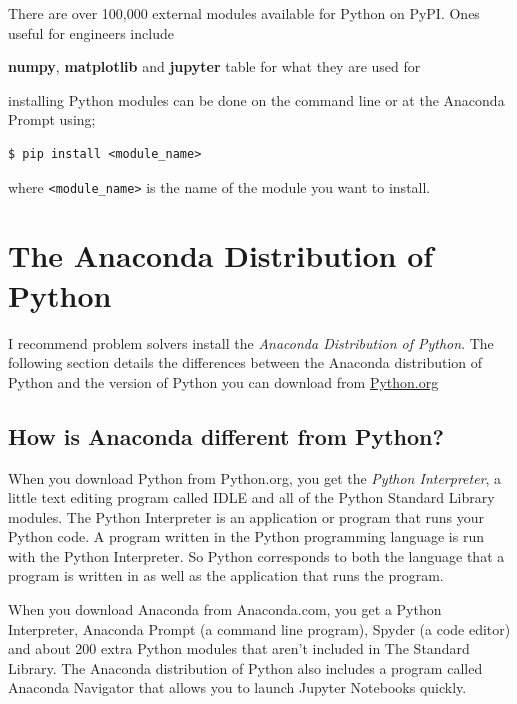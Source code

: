 \documentclass{book}
\begin{document}
There are over 100,000 external modules available for Python on PyPI.
Ones useful for engineers include

\textbf{numpy}, \textbf{matplotlib} and \textbf{jupyter} table for what
they are used for

installing Python modules can be done on the command line or at the
Anaconda Prompt using;

\begin{lstlisting}
$ pip install <module_name>
\end{lstlisting}

where \lstinline!<module_name>! is the name of the module you want to
install.
    




    
        \section{The Anaconda Distribution of
Python}\label{the-anaconda-distribution-of-python}
    




    
        I recommend problem solvers install the \emph{Anaconda Distribution of
Python}. The following section details the differences between the
Anaconda distribution of Python and the version of Python you can
download from \href{https://python.org}{Python.org}
    




    
        \subsection{How is Anaconda different from
Python?}\label{how-is-anaconda-different-from-python}

When you download Python from Python.org, you get the \emph{Python
Interpreter}, a little text editing program called IDLE and all of the
Python Standard Library modules. The Python Interpreter is an
application or program that runs your Python code. A program written in
the Python programming language is run with the Python Interpreter. So
Python corresponds to both the language that a program is written in as
well as the application that runs the program.

When you download Anaconda from Anaconda.com, you get a Python
Interpreter, Anaconda Prompt (a command line program), Spyder (a code
editor) and about 200 extra Python modules that aren't included in The
Standard Library. The Anaconda distribution of Python also includes a
program called Anaconda Navigator that allows you to launch Jupyter
Notebooks quickly.
    
\end{document}
